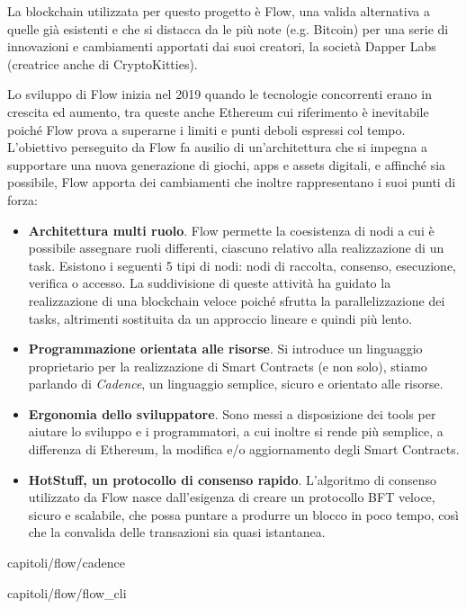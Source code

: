 La blockchain utilizzata per questo progetto è Flow, una valida alternativa a quelle già esistenti e che si distacca da le più note (e.g. Bitcoin) per una serie di innovazioni e cambiamenti apportati dai suoi creatori, la società Dapper Labs (creatrice anche di CryptoKitties). 

Lo sviluppo di Flow inizia nel 2019 quando le tecnologie concorrenti erano in crescita ed aumento, tra queste anche Ethereum cui riferimento è inevitabile poiché Flow prova a superarne i limiti e punti deboli espressi col tempo. L'obiettivo perseguito da Flow fa ausilio di un'architettura che si impegna a supportare una nuova generazione di giochi, apps e assets digitali, e affinché sia possibile, Flow apporta dei cambiamenti che inoltre rappresentano i suoi punti di forza: 

\begin{itemize}
    \item \textbf{Architettura multi ruolo}. Flow permette la coesistenza di nodi a cui è possibile assegnare ruoli differenti, ciascuno relativo alla realizzazione di un task. Esistono i seguenti 5 tipi di nodi: nodi di raccolta, consenso, esecuzione, verifica o accesso. La suddivisione di queste attività ha guidato la realizzazione di una blockchain veloce poiché sfrutta la parallelizzazione dei tasks, altrimenti sostituita da un approccio lineare e quindi più lento.
    \item \textbf{Programmazione orientata alle risorse}. Si introduce un linguaggio proprietario per la realizzazione di Smart Contracts (e non solo), stiamo parlando di \textit{Cadence}, un linguaggio semplice, sicuro e orientato alle risorse.
    \item \textbf{Ergonomia dello sviluppatore}. Sono messi a disposizione dei tools per aiutare lo sviluppo e i programmatori, a cui inoltre si rende più semplice, a differenza di Ethereum, la modifica e/o aggiornamento degli Smart Contracts.
    \item \textbf{HotStuff, un protocollo di consenso rapido}. L'algoritmo di consenso utilizzato da Flow nasce dall'esigenza di creare un protocollo BFT veloce, sicuro e scalabile, che possa puntare a produrre un blocco in poco tempo, così che la convalida delle transazioni sia quasi istantanea.
\end{itemize}


{capitoli/flow/cadence}

{capitoli/flow/flow_cli}